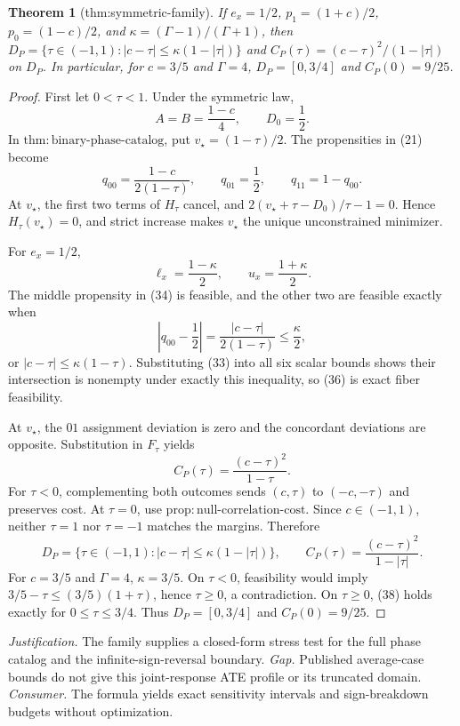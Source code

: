 \documentclass{article}
\newtheorem{theorem}{Theorem}
\begin{document}
\begin{theorem}[thm:symmetric-family]\label{thm:symmetric-family}
If \(e_x=1/2\), \(p_1=(1+c)/2\), \(p_0=(1-c)/2\), and \(\kappa=(\Gamma-1)/(\Gamma+1)\), then \(D_P=\{\tau\in(-1,1):|c-\tau|\leq\kappa(1-|\tau|)\}\) and \(C_P(\tau)=(c-\tau)^2/(1-|\tau|)\) on \(D_P\). In particular, for \(c=3/5\) and \(\Gamma=4\), \(D_P=[0,3/4]\) and \(C_P(0)=9/25\).
\end{theorem}
\begin{proof}
First let \(0<\tau<1\). Under the symmetric law,
\[
A=B=\frac{1-c}{4},\qquad D_0=\frac12. \tag{33}
\]
In \(\mathrm{thm{:}binary\mbox{-}phase\mbox{-}catalog}\), put \(v_\star=(1-\tau)/2\). The propensities in (21) become
\[
q_{00}=\frac{1-c}{2(1-\tau)},\qquad q_{01}=\frac12,\qquad q_{11}=1-q_{00}. \tag{34}
\]
At \(v_\star\), the first two terms of \(H_\tau\) cancel, and \(2(v_\star+\tau-D_0)/\tau-1=0\). Hence \(H_\tau(v_\star)=0\), and strict increase makes \(v_\star\) the unique unconstrained minimizer.

For \(e_x=1/2\),
\[
\ell_x=\frac{1-\kappa}{2},\qquad u_x=\frac{1+\kappa}{2}. \tag{35}
\]
The middle propensity in (34) is feasible, and the other two are feasible exactly when
\[
\left|q_{00}-\frac12\right|
=\frac{|c-\tau|}{2(1-\tau)}\leq\frac{\kappa}{2}, \tag{36}
\]
or \(|c-\tau|\leq\kappa(1-\tau)\). Substituting (33) into all six scalar bounds shows their intersection is nonempty under exactly this inequality, so (36) is exact fiber feasibility.

At \(v_\star\), the \(01\) assignment deviation is zero and the concordant deviations are opposite. Substitution in \(F_\tau\) yields
\[
C_P(\tau)=\frac{(c-\tau)^2}{1-\tau}. \tag{37}
\]
For \(\tau<0\), complementing both outcomes sends \((c,\tau)\) to \((-c,-\tau)\) and preserves cost. At \(\tau=0\), use \(\mathrm{prop{:}null\mbox{-}correlation\mbox{-}cost}\). Since \(c\in(-1,1)\), neither \(\tau=1\) nor \(\tau=-1\) matches the margins. Therefore
\[
D_P=\{\tau\in(-1,1):|c-\tau|\leq\kappa(1-|\tau|)\},\qquad
C_P(\tau)=\frac{(c-\tau)^2}{1-|\tau|}. \tag{38}
\]
For \(c=3/5\) and \(\Gamma=4\), \(\kappa=3/5\). On \(\tau<0\), feasibility would imply \(3/5-\tau\leq(3/5)(1+\tau)\), hence \(\tau\geq0\), a contradiction. On \(\tau\geq0\), (38) holds exactly for \(0\leq\tau\leq3/4\). Thus \(D_P=[0,3/4]\) and \(C_P(0)=9/25\).
\end{proof}
\par\smallskip\noindent \textit{Justification.} The family supplies a closed-form stress test for the full phase catalog and the infinite-sign-reversal boundary. \textit{Gap.} Published average-case bounds do not give this joint-response ATE profile or its truncated domain. \textit{Consumer.} The formula yields exact sensitivity intervals and sign-breakdown budgets without optimization.
\end{document}
